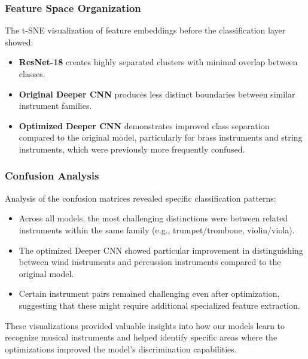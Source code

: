 \subsubsection{Feature Space Organization}
The t-SNE visualization of feature embeddings before the classification layer showed:
\begin{itemize}
    \item \textbf{ResNet-18} creates highly separated clusters with minimal overlap between classes.
    
    \item \textbf{Original Deeper CNN} produces less distinct boundaries between similar instrument families.
    
    \item \textbf{Optimized Deeper CNN} demonstrates improved class separation compared to the original model, particularly for brass instruments and string instruments, which were previously more frequently confused.
\end{itemize}

\subsubsection{Confusion Analysis}
Analysis of the confusion matrices revealed specific classification patterns:
\begin{itemize}
    \item Across all models, the most challenging distinctions were between related instruments within the same family (e.g., trumpet/trombone, violin/viola).
    
    \item The optimized Deeper CNN showed particular improvement in distinguishing between wind instruments and percussion instruments compared to the original model.
    
    \item Certain instrument pairs remained challenging even after optimization, suggesting that these might require additional specialized feature extraction.
\end{itemize}

These visualizations provided valuable insights into how our models learn to recognize musical instruments and helped identify specific areas where the optimizations improved the model's discrimination capabilities.
